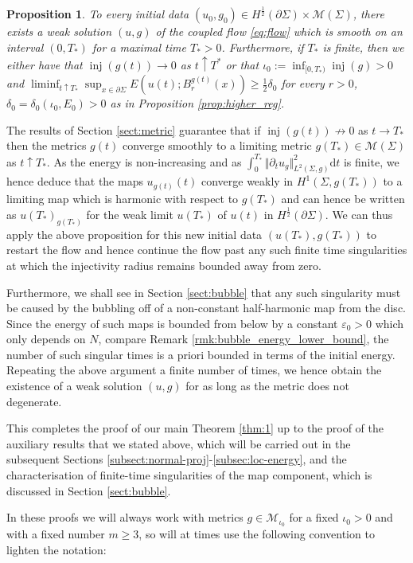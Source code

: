 \documentclass[10pt,reqno]{amsart}
\theoremstyle{plain}
\newtheorem{prop}[lemma]{Proposition}
\theoremstyle{definition}
\numberwithin{equation}{section}
\newcommand{\de}{\delta}
\newcommand{\Si}{\Sigma}
\newcommand{\upto}{\uparrow}
\DeclareMathOperator{\inj}{inj}
\newcommand{\norm}[1]{\Vert#1\Vert}
\newcommand{\half}{\frac{1}{2}}
\newcommand{\dd}{\mathrm{d}} %
\newcommand{\pt}{\partial_t}
\newcommand{\eps}{\varepsilon}
\newcommand{\pSi}{{\partial \Sigma}}
\newcommand{\MM}{\mathcal{M}} %
\newcommand{\MMiota}{\MM_{\iota_0}}
\begin{document}
\begin{prop}\label{prop:existence-all-initial-data}
    To every initial data $(u_0,g_0)\in H^{\half}(\pSi)\times \MM(\Si)$, there exists a weak solution $(u,g)$ of the coupled flow \eqref{eq:flow} which is smooth on an interval $(0,T_*)$ for a maximal time $T_*>0$. Furthermore, if $T_*$ is finite, then we either have that   $\inj(g(t))\to 0$ as $t\upto T^*$ or that $\iota_0:= \inf_{[0,T_*)} \inj(g)>0$ and $\liminf_{t\upto T_*} \sup_{x\in \pSi} E(u(t);B_r^{g(t)}(x))\geq \half \de_0$ for every $r>0$, $\de_0=\de_0(\iota_0, E_0)>0$ as in Proposition \ref{prop:higher_reg}. 
\end{prop}
The results of Section \ref{sect:metric} guarantee that if $\inj(g(t))\nrightarrow 0$ as $t\to T_*$ then the metrics $g(t)$ converge smoothly to a limiting metric $g(T_*)\in \MM(\Si)$ as $t\upto T_*$. As the energy is non-increasing and as $\int_{0}^{T_*}\norm{\pt u_g}_{L^2(\Si,g)}^2 \dd t$ is finite, we hence deduce that the maps $u_{g(t)}(t)$ converge weakly in $H^1(\Si,g(T_*))$ to a limiting map which is harmonic with respect to $g(T_*)$ and can hence be written as $u(T_*)_{g(T_*)}$ for the weak limit  $u(T_*)$ of $u(t)$ in $H^\half(\pSi)$. We can thus apply the above proposition for this new initial data $(u(T_*),g(T_*))$ to restart the flow and hence continue the flow past any such finite time singularities at which the injectivity radius remains bounded away from zero.

Furthermore, we shall see in Section 
\ref{sect:bubble}
that any such singularity must be caused by the bubbling off of a non-constant half-harmonic map from the disc. Since the energy of such maps is bounded from below by a constant $\eps_0>0$ which only depends on $N$, compare Remark \ref{rmk:bubble_energy_lower_bound}, the number of such singular times is a priori bounded in terms of the initial energy. Repeating the above argument a finite number of times, we hence obtain the existence of a weak solution $(u,g)$ for as long as the metric does not degenerate. 

This completes the proof of our main Theorem \ref{thm:1} up to the proof of the auxiliary results that we stated above, which will be carried out in the subsequent Sections \ref{subsect:normal-proj}-\ref{subsec:loc-energy}, and the characterisation of finite-time singularities of the map component, which is discussed in Section \ref{sect:bubble}. 

In these proofs we will always work with metrics $g\in \MMiota$ for a fixed $\iota_0>0$ and with a fixed number $m\geq 3$, so will at times use the following convention to lighten the notation:
\end{document}
